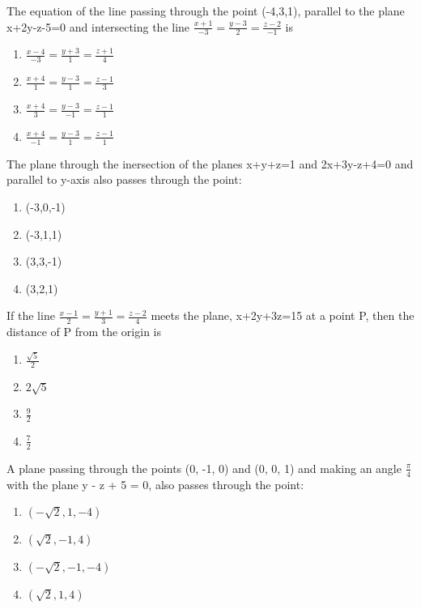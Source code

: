 \item The equation of the line passing through the point (-4,3,1), parallel to the plane x+2y-z-5=0 and intersecting the line $\frac{x+1}{-3}=\frac{y-3}{2}=\frac{z-2}{-1}$ is
\begin{enumerate}
\item $\frac{x-4}{-3}=\frac{y+3}{1}=\frac{z+1}{4}$
\item $\frac{x+4}{1}=\frac{y-3}{1}=\frac{z-1}{3}$
\item $\frac{x+4}{3}=\frac{y-3}{-1}=\frac{z-1}{1}$
\item $\frac{x+4}{-1}=\frac{y-3}{1}=\frac{z-1}{1}$
\end{enumerate}

\item The plane through the inersection of the planes x+y+z=1 and 2x+3y-z+4=0 and parallel to y-axis also passes through the point:
\begin{enumerate}
\item (-3,0,-1)
\item (-3,1,1)
\item (3,3,-1)
\item (3,2,1)
\end{enumerate}

\item If the line $\frac{x-1}{2}=\frac{y+1}{3}=\frac{z-2}{4}$ meets the plane, x+2y+3z=15 at a point P, then the distance of P from the origin is
\begin{enumerate}
\item $\frac{\sqrt{5}}{2}$
\item $2\sqrt{5}$
\item $\frac{9}{2}$
\item $\frac{7}{2}$
\end{enumerate}

\item A plane passing through the points (0, -1, 0) and (0, 0, 1) and making an angle $\frac{\pi}{4}$ with the plane y - z + 5 = 0, also passes through the point:
\begin{enumerate}
\item $(-\sqrt{2}, 1, -4)$
\item $(\sqrt{2}, -1, 4)$
\item $(-\sqrt{2}, -1, -4)$
\item $(\sqrt{2}, 1, 4)$
\end{enumerate}


